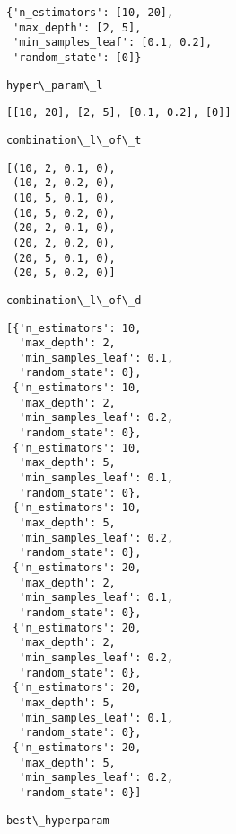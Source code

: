 \documentclass[11pt]{article}
\begin{document}
    
    \begin{verbatim}
{'n_estimators': [10, 20],
 'max_depth': [2, 5],
 'min_samples_leaf': [0.1, 0.2],
 'random_state': [0]}
    \end{verbatim}

    
    \begin{Verbatim}[commandchars=\\\{\}]
hyper\_param\_l

    \end{Verbatim}

    
    \begin{verbatim}
[[10, 20], [2, 5], [0.1, 0.2], [0]]
    \end{verbatim}

    
    \begin{Verbatim}[commandchars=\\\{\}]
combination\_l\_of\_t

    \end{Verbatim}

    
    \begin{verbatim}
[(10, 2, 0.1, 0),
 (10, 2, 0.2, 0),
 (10, 5, 0.1, 0),
 (10, 5, 0.2, 0),
 (20, 2, 0.1, 0),
 (20, 2, 0.2, 0),
 (20, 5, 0.1, 0),
 (20, 5, 0.2, 0)]
    \end{verbatim}

    
    \begin{Verbatim}[commandchars=\\\{\}]
combination\_l\_of\_d

    \end{Verbatim}

    
    \begin{verbatim}
[{'n_estimators': 10,
  'max_depth': 2,
  'min_samples_leaf': 0.1,
  'random_state': 0},
 {'n_estimators': 10,
  'max_depth': 2,
  'min_samples_leaf': 0.2,
  'random_state': 0},
 {'n_estimators': 10,
  'max_depth': 5,
  'min_samples_leaf': 0.1,
  'random_state': 0},
 {'n_estimators': 10,
  'max_depth': 5,
  'min_samples_leaf': 0.2,
  'random_state': 0},
 {'n_estimators': 20,
  'max_depth': 2,
  'min_samples_leaf': 0.1,
  'random_state': 0},
 {'n_estimators': 20,
  'max_depth': 2,
  'min_samples_leaf': 0.2,
  'random_state': 0},
 {'n_estimators': 20,
  'max_depth': 5,
  'min_samples_leaf': 0.1,
  'random_state': 0},
 {'n_estimators': 20,
  'max_depth': 5,
  'min_samples_leaf': 0.2,
  'random_state': 0}]
    \end{verbatim}

    
    \begin{Verbatim}[commandchars=\\\{\}]
best\_hyperparam

    \end{Verbatim}
\end{document}
